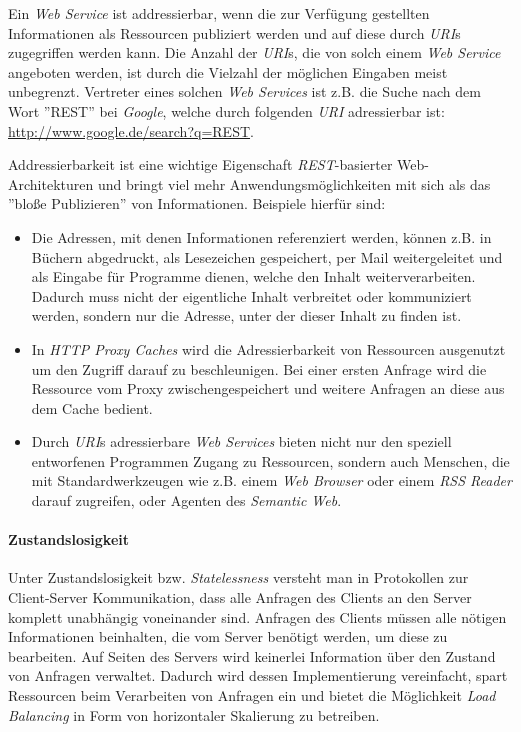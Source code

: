 Ein \textit{Web Service} ist addressierbar, wenn die zur Verfügung
gestellten Informationen als Ressourcen publiziert werden und auf
diese durch \textit{URI}s zugegriffen werden kann. Die Anzahl der
\textit{URI}s, die von solch einem \textit{Web Service} angeboten
werden, ist durch die Vielzahl der möglichen Eingaben meist
unbegrenzt.  Vertreter eines solchen \textit{Web Services} ist
z.B. die Suche nach dem Wort ''REST'' bei \textit{Google}, welche
durch folgenden \textit{URI} adressierbar ist:
\url{http://www.google.de/search?q=REST}.

Addressierbarkeit ist eine wichtige Eigenschaft
\textit{REST}-basierter Web-Archi\-tekturen und bringt viel mehr
Anwendungsmöglichkeiten mit sich als das ''bloße Publizieren'' von
Informationen. Beispiele hierfür sind:

\begin{itemize}
\item Die Adressen, mit denen Informationen referenziert werden,
  können z.B. in Büchern abgedruckt, als Lesezeichen gespeichert, per
  Mail weitergeleitet und als Eingabe für Programme dienen, welche den
  Inhalt weiterverarbeiten. Dadurch muss nicht der eigentliche Inhalt
  verbreitet oder kommuniziert werden, sondern nur die Adresse, unter
  der dieser Inhalt zu finden ist.
\item In \textit{HTTP Proxy Caches} wird die Adressierbarkeit von
  Ressourcen ausgenutzt um den Zugriff darauf zu beschleunigen. Bei
  einer ersten Anfrage wird die Ressource vom Proxy
  zwischengespeichert und weitere Anfragen an diese aus dem Cache
  bedient.
\item Durch \textit{URI}s adressierbare \textit{Web Services} bieten
  nicht nur den speziell entworfenen Programmen Zugang zu Ressourcen,
  sondern auch Menschen, die mit Standardwerkzeugen wie z.B. einem
  \textit{Web Browser} oder einem \textit{RSS Reader} darauf
  zugreifen, oder Agenten des \textit{Semantic Web}.
\end{itemize}

\paragraph{Zustandslosigkeit}
Unter Zustandslosigkeit bzw. \textit{Statelessness} versteht man in
Protokollen zur Client-Server Kommunikation, dass alle Anfragen des
Clients an den Server komplett unabhängig voneinander sind. Anfragen
des Clients müssen alle nötigen Informationen beinhalten, die vom
Server benötigt werden, um diese zu bearbeiten. Auf Seiten des Servers
wird keinerlei Information über den Zustand von Anfragen
verwaltet. Dadurch wird dessen Implementierung vereinfacht, spart
Ressourcen beim Verarbeiten von Anfragen ein und bietet die
Möglichkeit \textit{Load Balancing} in Form von horizontaler
Skalierung zu betreiben.

